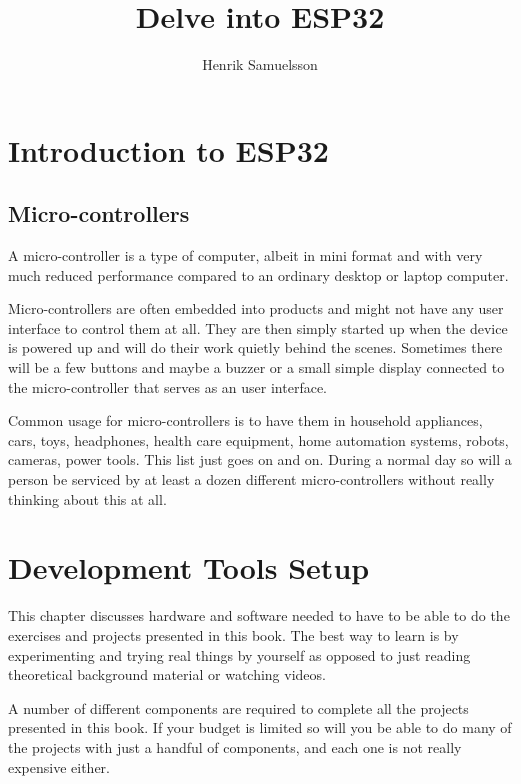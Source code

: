 \documentclass{tufte-book}
\title{Delve into ESP32}
\author{Henrik Samuelsson}
\begin{document}
\maketitle

\cleardoublepage

\tableofcontents

\chapter{Introduction to ESP32}

\section{Micro-controllers}
A micro-controller is a type of computer, albeit in mini format and 
with very much reduced performance compared to an ordinary desktop or laptop 
computer. 

Micro-controllers are often embedded into products and might not have 
any user interface to control them at all. They are then simply started up when 
the device is powered up and will do their work quietly behind the scenes. 
Sometimes there will be a few buttons and maybe a buzzer or a small simple 
display connected to the micro-controller that serves as an user interface.

Common usage for micro-controllers is to have them in household appliances, 
cars, toys, headphones, health care equipment, home automation systems, robots, 
cameras, power tools. This list just goes on and on. During a normal day so 
will a person be serviced by at least a dozen different micro-controllers 
without really thinking about this at all.  


\chapter{Development Tools Setup}

This chapter discusses hardware and software needed to have to be able to do 
the exercises and projects presented in this book. The best way to learn is by 
experimenting and trying real things by yourself as opposed to just reading 
theoretical background material or watching videos.

A number of different components are required to complete all the projects 
presented in this book. If your budget is limited so will you be able to do 
many of the projects with just a handful of components, and each one is not 
really expensive either.
\end{document}
